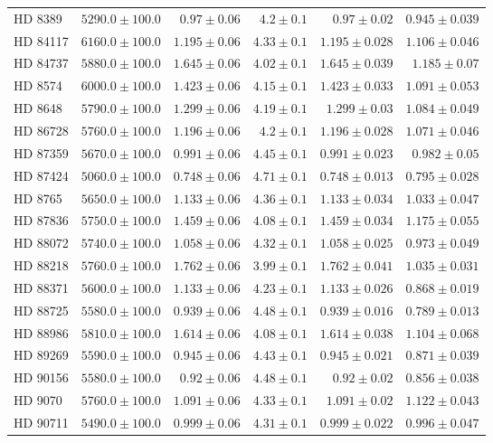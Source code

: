 \begin{longtable*}{lrrrrr}
HD 8389 & $5290.0\pm 100.0$ & $0.97\pm 0.06$ & $4.2\pm 0.1$ & $0.97\pm 0.02$ & $0.945\pm 0.039$ \\ 
HD 84117 & $6160.0\pm 100.0$ & $1.195\pm 0.06$ & $4.33\pm 0.1$ & $1.195\pm 0.028$ & $1.106\pm 0.046$ \\ 
HD 84737 & $5880.0\pm 100.0$ & $1.645\pm 0.06$ & $4.02\pm 0.1$ & $1.645\pm 0.039$ & $1.185\pm 0.07$ \\ 
HD 8574 & $6000.0\pm 100.0$ & $1.423\pm 0.06$ & $4.15\pm 0.1$ & $1.423\pm 0.033$ & $1.091\pm 0.053$ \\ 
HD 8648 & $5790.0\pm 100.0$ & $1.299\pm 0.06$ & $4.19\pm 0.1$ & $1.299\pm 0.03$ & $1.084\pm 0.049$ \\ 
HD 86728 & $5760.0\pm 100.0$ & $1.196\pm 0.06$ & $4.2\pm 0.1$ & $1.196\pm 0.028$ & $1.071\pm 0.046$ \\ 
HD 87359 & $5670.0\pm 100.0$ & $0.991\pm 0.06$ & $4.45\pm 0.1$ & $0.991\pm 0.023$ & $0.982\pm 0.05$ \\ 
HD 87424 & $5060.0\pm 100.0$ & $0.748\pm 0.06$ & $4.71\pm 0.1$ & $0.748\pm 0.013$ & $0.795\pm 0.028$ \\ 
HD 8765 & $5650.0\pm 100.0$ & $1.133\pm 0.06$ & $4.36\pm 0.1$ & $1.133\pm 0.034$ & $1.033\pm 0.047$ \\ 
HD 87836 & $5750.0\pm 100.0$ & $1.459\pm 0.06$ & $4.08\pm 0.1$ & $1.459\pm 0.034$ & $1.175\pm 0.055$ \\ 
HD 88072 & $5740.0\pm 100.0$ & $1.058\pm 0.06$ & $4.32\pm 0.1$ & $1.058\pm 0.025$ & $0.973\pm 0.049$ \\ 
HD 88218 & $5760.0\pm 100.0$ & $1.762\pm 0.06$ & $3.99\pm 0.1$ & $1.762\pm 0.041$ & $1.035\pm 0.031$ \\ 
HD 88371 & $5600.0\pm 100.0$ & $1.133\pm 0.06$ & $4.23\pm 0.1$ & $1.133\pm 0.026$ & $0.868\pm 0.019$ \\ 
HD 88725 & $5580.0\pm 100.0$ & $0.939\pm 0.06$ & $4.48\pm 0.1$ & $0.939\pm 0.016$ & $0.789\pm 0.013$ \\ 
HD 88986 & $5810.0\pm 100.0$ & $1.614\pm 0.06$ & $4.08\pm 0.1$ & $1.614\pm 0.038$ & $1.104\pm 0.068$ \\ 
HD 89269 & $5590.0\pm 100.0$ & $0.945\pm 0.06$ & $4.43\pm 0.1$ & $0.945\pm 0.021$ & $0.871\pm 0.039$ \\ 
HD 90156 & $5580.0\pm 100.0$ & $0.92\pm 0.06$ & $4.48\pm 0.1$ & $0.92\pm 0.02$ & $0.856\pm 0.038$ \\ 
HD 9070 & $5760.0\pm 100.0$ & $1.091\pm 0.06$ & $4.33\pm 0.1$ & $1.091\pm 0.02$ & $1.122\pm 0.043$ \\ 
HD 90711 & $5490.0\pm 100.0$ & $0.999\pm 0.06$ & $4.31\pm 0.1$ & $0.999\pm 0.022$ & $0.996\pm 0.047$ \\ 

\end{longtable*}
